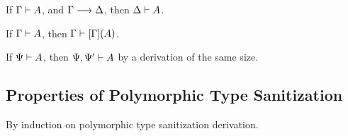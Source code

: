 \begin{lemma}
  \label{lemma:dunfield:ExtensionWeakening}
  If $\Gamma \vdash A$,
  and $\Gamma \longrightarrow \Delta$,
  then  $\Delta \vdash A$.
\end{lemma}

\begin{lemma}
  \label{lemma:dunfield:SubstitutionTyping}
  If $\Gamma \vdash A$,
  then  $\Gamma \vdash [\Gamma](A)$.
\end{lemma}

\begin{proposition}[Weakening]
  \label{lemma:dunfield:Weakening}
  If $\Psi \vdash A$,
  then  $\Psi, \Psi' \vdash A$ by a derivation of the same size.
\end{proposition}

\subsection{Properties of Polymorphic Type Sanitization}

\begin{lemma}[\PolymorphicTypeSanitizationExtensionName]\leavevmode
  \label{lemma:\PolymorphicTypeSanitizationExtensionName}
  \PolymorphicTypeSanitizationExtensionBody
\end{lemma}

\proof

By induction on polymorphic type sanitization derivation.


